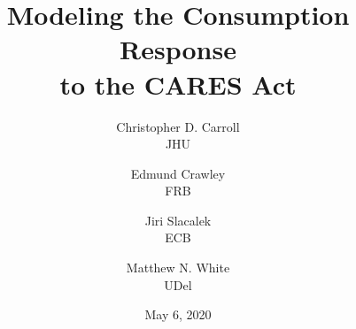 \documentclass[titlepage,a4paper]{\econtex}
\renewcommand{\forcedate}{May 6, 2020}
\begin{document}


\hfill{\tiny \jobname}

\title{Modeling the Consumption Response\\ to the CARES Act}

{
  \author{
    Christopher D. Carroll\authNum \\ {\small JHU}
    \and
    Edmund Crawley\authNum   \\ {\small FRB}
    \and
    Jiri Slacalek\authNum    \\ {\small ECB}
    \and
    Matthew N. White\authNum \\ {\small UDel}
  }
} %



\date{\forcedate}
\maketitle
\end{document}
